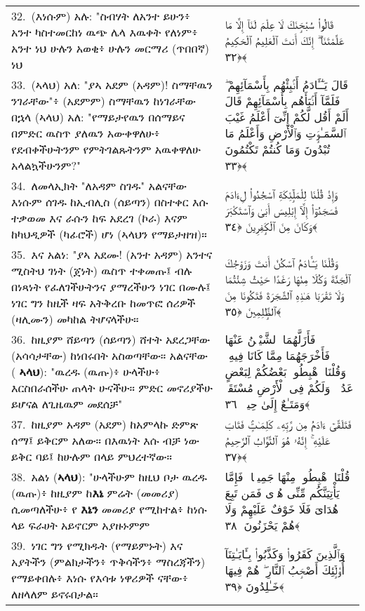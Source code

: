 \documentclass[11pt,a4paper,oneside]{article}%
\newcommand{\mytextarabic}[1]{\textarabic{ #1 \flushright}}
\begin{document}
\begin{longtable}{%
  @{}
    p{}
  @{~~~}
    p{}
    @{}
}
32.\ (እነሱም) አሉ: "ስብሃት ለአንተ ይሁን፥ አንተ ካስተመርከነ ዉጭ ሌላ እዉቀት የለነም፥ አንተ ነህ ሁሉን አወቂ፥ ሁሉን መርማሪ (ጥበበኛ) ነህ &  \mytextarabic{قَالُوا۟ سُبْحَٟنَكَ لَا عِلْمَ لَنَآ إِلَّا مَا عَلَّمْتَنَآ ۖ إِنَّكَ أَنتَ ٱلْعَلِيمُ ٱلْحَكِيمُ ﴿٣٢﴾}\\
33.\ (ኣላህ) አለ: "ያኣ አደም (አዳም)! ስማቸዉን ንገራቸው"፥ (አደምም) ስማቸዉን ከነገራቸው  በኋላ (ኣላህ) አለ: "የማይታየዉን በሰማይና በምድር ዉስጥ ያለዉን አውቀዋለሁ፥ የደብቀችሁትንም  የምትገልጹትንም አዉቀዋለሁ አላልኳችሁንም?" &  \mytextarabic{قَالَ يَـٰٓـَٔادَمُ أَنۢبِئْهُم بِأَسْمَآئِهِمْ ۖ فَلَمَّآ أَنۢبَأَهُم بِأَسْمَآئِهِمْ قَالَ أَلَمْ أَقُل لَّكُمْ إِنِّىٓ أَعْلَمُ غَيْبَ ٱلسَّمَـٰوَٟتِ وَٱلْأَرْضِ وَأَعْلَمُ مَا تُبْدُونَ وَمَا كُنتُمْ تَكْتُمُونَ ﴿٣٣﴾}\\
34.\ ለመላኢክት "ለአዳም ስገዱ" አልናቸው እነሱም ሰገዱ ከኢብሊስ (ሰይጣን) በስተቀር እሱ ተቃወመ እና ራሱን ከፍ አደረገ (ኮራ) እናም ከካህዲዎች (ካፊሮች) ሆነ (ኣላህን የማይታዘዝ)። &  \mytextarabic{وَإِذْ قُلْنَا لِلْمَلَٟٓئِكَةِ ٱسْجُدُوا۟ لِءَادَمَ فَسَجَدُوٓا۟ إِلَّآ إِبْلِيسَ أَبَىٰ وَٱسْتَكْبَرَ وَكَانَ مِنَ ٱلْكَٟفِرِينَ ﴿٣٤﴾}\\
35.\ እና አልነ: "ያኣ አደሙ! (አንተ አዳም) አንተና ሚስትህ ገነት (ጀነት) ዉስጥ  ተቀመጡ፤ ብሉ በነጻነት የፈለገችሁትንና ያማረችሁን ነገር በሙሉ፤ ነገር ግን ከዚች ዛፍ አትቅረቡ ከመጥፎ ሰሪዎች (ዛሊሙን) መካከል ትሆናላችሁ። &  \mytextarabic{وَقُلْنَا يَـٰٓـَٔادَمُ ٱسْكُنْ أَنتَ وَزَوْجُكَ ٱلْجَنَّةَ وَكُلَا مِنْهَا رَغَدًا حَيْثُ شِئْتُمَا وَلَا تَقْرَبَا هَـٰذِهِ ٱلشَّجَرَةَ فَتَكُونَا مِنَ ٱلظَّٟلِمِينَ ﴿٣٥﴾}\\
36.\ ከዚያም ሸይጣን (ሰይጣን) ሸተት አደረጋቸው (አሳሳታቸው) ከነበሩበት አስወጣቸው። አልናቸው ( {\bf ኣላህ}): "ዉረዱ (ዉጡ)፥ ሁላችሁ፥ እርስበራሰችሁ ጠላት ሁናችሁ። ምድር መኖሪያችሁ ይሆናል ለጊዜዉም መደሰቻ" &  \mytextarabic{فَأَزَلَّهُمَا ٱلشَّيْطَٟنُ عَنْهَا فَأَخْرَجَهُمَا مِمَّا كَانَا فِيهِ ۖ وَقُلْنَا ٱهْبِطُوا۟ بَعْضُكُمْ لِبَعْضٍ عَدُوٌّۭ ۖ وَلَكُمْ فِى ٱلْأَرْضِ مُسْتَقَرٌّۭ وَمَتَـٰعٌ إِلَىٰ حِينٍۢ ﴿٣٦﴾}\\
37.\ ከዚያም አዳም (አደም) ከአምላኩ ድምጽ ሰማ፤ ይቅርም አለው። በእዉነት እሱ ብቻ ነው ይቅር ባይ፤ ከሁሉም በላይ ምህረተኛው። &  \mytextarabic{فَتَلَقَّىٰٓ ءَادَمُ مِن رَّبِّهِۦ كَلِمَـٰتٍۢ فَتَابَ عَلَيْهِ ۚ إِنَّهُۥ هُوَ ٱلتَّوَّابُ ٱلرَّحِيمُ ﴿٣٧﴾}\\
38.\ አልነ ({\bf ኣላህ}): "ሁላችሁም ከዚህ ቦታ ዉረዱ (ዉጡ)፥ ከዚያም ከ{\bf እኔ} ምሬት (መመሪያ) ሲመጣለችሁ፥ የ {\bf እኔን} መመሪያ የሚከተል፥ ከነሱ ላይ ፍራሀት አይኖርም አያዙኑምም &   \mytextarabic{قُلْنَا ٱهْبِطُوا۟ مِنْهَا جَمِيعًۭا ۖ فَإِمَّا يَأْتِيَنَّكُم مِّنِّى هُدًۭى فَمَن تَبِعَ هُدَاىَ فَلَا خَوْفٌ عَلَيْهِمْ وَلَا هُمْ يَحْزَنُونَ ﴿٣٨﴾}\\
39.\ ነገር ግን የሚክዱት (የማይምኑት) እና  አያትችን (ምልክታችን፥ ጥቅሳችን፥ ማስረጃችን) የማይቀበሉ፥ እነሱ የእሳቱ ነዋሪዎች ናቸው፥ ለዘላለም ይኖሩበታል። &  \mytextarabic{وَٱلَّذِينَ كَفَرُوا۟ وَكَذَّبُوا۟ بِـَٔايَـٰتِنَآ أُو۟لَٟٓئِكَ أَصْحَٟبُ ٱلنَّارِ ۖ هُمْ فِيهَا خَـٰلِدُونَ ﴿٣٩﴾} \\

\end{longtable}
\end{document}
